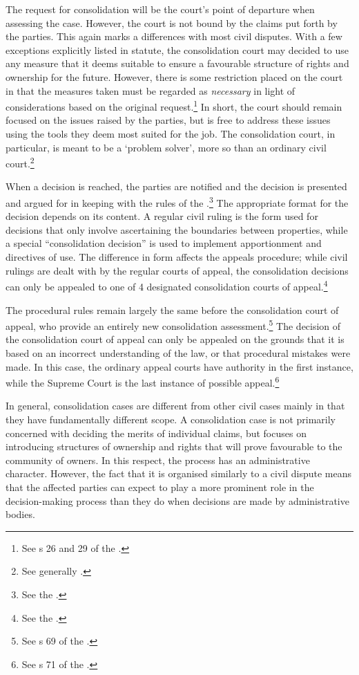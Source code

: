The request for consolidation will be the court's point of departure when assessing the case. However, the court is not bound by the claims put forth by the parties. This again marks a differences with most civil disputes. With a few exceptions explicitly listed in statute, the consolidation court may decided to use any measure that it deems suitable to ensure a favourable structure of rights and ownership for the future. However, there is some restriction placed on the court in that the measures taken must be regarded as \emph{necessary} in light of considerations based on the original request.\footnote{See s 26 and 29 of the \cite{lca79}.} In short, the court should remain focused on the issues raised by the parties, but is free to address these issues using the tools they deem most suited for the job. The consolidation court, in particular, is meant to be a `problem solver', more so than an ordinary civil court.\footnote{See generally \cite{rognes07}.}

When a decision is reached, the parties are notified and the decision is presented and argued for in keeping with the rules of the \cite{cda05}.\footnote{See the 
\cite[7|22]{lca79}.} The appropriate format for the decision depends on its content. A regular civil ruling is the form used for decisions that only involve ascertaining the boundaries between properties, while a special ``consolidation decision'' is used to implement apportionment and directives of use. The difference in form affects the appeals procedure; while civil rulings are dealt with by the regular courts of appeal, the consolidation decisions can only be appealed to one of 4 designated consolidation courts of appeal.\footnote{See the \cite[61]{lca79}.}

The procedural rules remain largely the same before the consolidation court of appeal, who provide an entirely new consolidation assessment.\footnote{See s 69 of the \cite{lca79}.} The decision of the consolidation court of appeal can only be appealed on the grounds that it is based on an incorrect understanding of the law, or that procedural mistakes were made. In this case, the ordinary appeal courts have authority in the first instance, while the Supreme Court is the last instance of possible appeal.\footnote{See s 71 of the \cite{lca79}.}

In general, consolidation cases are different from other civil cases mainly in that they have fundamentally different scope. A consolidation case is not primarily concerned with deciding the merits of individual claims, but focuses on introducing structures of ownership and rights that will prove favourable to the community of owners. In this respect, the process has an administrative character. However, the fact that it is organised similarly to a civil dispute means that the affected parties can expect to play a more prominent role in the decision-making process than they do when decisions are made by administrative bodies.

